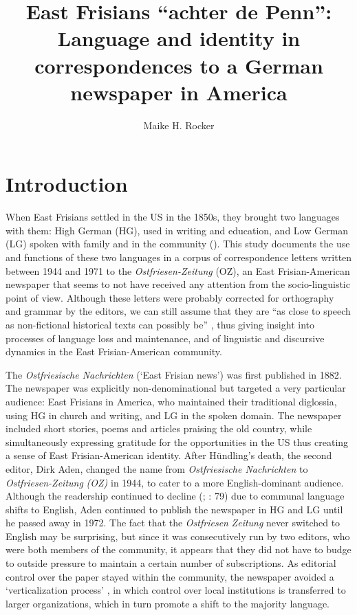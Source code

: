 \documentclass[output=paper]{langsci/langscibook}
\author{Maike H. Rocker\affiliation{The Pennsylvania State University}}
\title[East Frisians ``achter de Penn'']
      {East Frisians ``achter de Penn'': Language and identity in correspondences to a German newspaper in America}
\begin{document}
\maketitle 


\section{Introduction} %
\label{sec:rocker:1}

When East Frisians settled in the US in the 1850s, they brought two languages with them: High German (HG), used in writing and education, and Low German (LG) spoken with family and in the community (\citealt{Schnucker1917, Frizzel1992}). This study documents the use and functions of these two languages in a corpus of correspondence letters written between 1944 and 1971 to the \textit{Ostfriesen-Zeitung} (OZ), an East Frisian-American newspaper that seems to not have received any attention from the socio-linguistic point of view. Although these letters were probably corrected for orthography and grammar by the editors, we can still assume that they are “as close to speech as non-fictional historical texts can possibly be” \citep[156]{Elspass2012}, thus giving insight into processes of language loss and maintenance, and of linguistic and discursive dynamics in the East Frisian-American community.

The \textit{Ostfriesische Nachrichten} (‘East Frisian news’) was first published in 1882. The newspaper was explicitly non-denominational but targeted a very particular audience: East Frisians in America, who maintained their traditional diglossia, using HG in church and writing, and LG in the spoken domain. The newspaper included short stories, poems and articles praising the old country, while simultaneously expressing gratitude for the opportunities in the US thus creating a sense of East Frisian-American identity. After Hündling’s death, the second editor, Dirk Aden, changed the name from \textit{Ostfriesische Nachrichten} to \textit{Ostfriesen-Zeitung} \textit{(OZ)} in 1944, to cater to a more English-dominant audience. Although the readership continued to decline (\citealt{Monahan1971}; \citealt{Lindaman2004}: 79) due to communal language shifts to English, Aden continued to publish the newspaper in HG and LG until he passed away in 1972. The fact that the \textit{Ostfriesen} \textit{Zeitung} never switched to English may be surprising, but since it was consecutively run by two editors, who were both members of the community, it appears that they did not have to budge to outside pressure to maintain a certain number of subscriptions. As editorial control over the paper stayed within the community, the newspaper avoided a ‘verticalization process’ \citep{Salmons1983}, in which control over local institutions is transferred to larger organizations, which in turn promote a shift to the majority language. 
\end{document}
